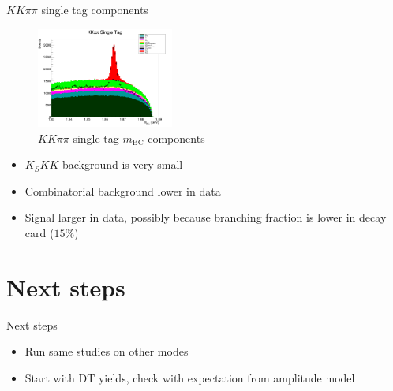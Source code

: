 \documentclass{beamer}
\begin{document}
\begin{frame}{$KK\pi\pi$ single tag components}
  \begin{figure}
    \centering
    \includegraphics[width=0.4\textwidth]{MCPlusData.png}
    \caption{$KK\pi\pi$ single tag $m_\text{BC}$ components}
  \end{figure}
  \begin{itemize}
    \item{$K_SKK$ background is very small}
    \item{Combinatorial background lower in data}
    \item{Signal larger in data, possibly because branching fraction is lower in decay card ($15\%$)}
  \end{itemize}
\end{frame}

\section{Next steps}
\begin{frame}{Next steps}
  \begin{itemize}
    \setlength\itemsep{2em}
    \item{Run same studies on other modes}
    \item{Start with DT yields, check with expectation from amplitude model}
  \end{itemize}
\end{frame}
\end{document}
